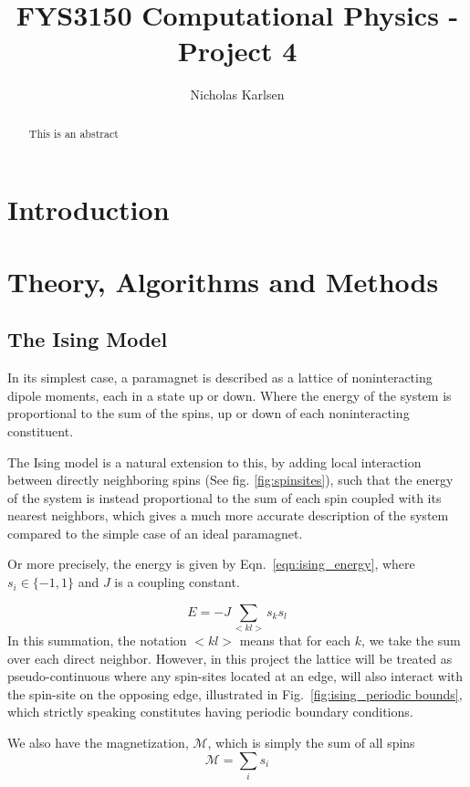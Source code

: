 \documentclass[10pt,showpacs,preprintnumbers,amsmath,amssymb,nofootinbib,aps,prl,twocolumn,groupedaddress,superscriptaddress,showkeys]{revtex4-1}
\begin{document}
\title{FYS3150 Computational Physics - Project 4}
\author{Nicholas Karlsen}


\begin{abstract}
  This is an abstract
\end{abstract}

\maketitle


\section{Introduction}
\section{Theory, Algorithms and Methods}
  \subsection{The Ising Model}
    In its simplest case, a paramagnet is described as a lattice of noninteracting dipole moments, each in a state up or down. Where the energy of the system is proportional to the sum of the spins, up or down of each noninteracting constituent.

    The Ising model is a natural extension to this, by adding local interaction between directly neighboring spins (See fig. \ref{fig:spinsites}), such that the energy of the system is instead proportional to the sum of each spin coupled with its nearest neighbors, which gives a much more accurate description of the system compared to the simple case of an ideal paramagnet.

    Or more precisely, the energy is given by Eqn.~\ref{eqn:ising_energy}, where $s_i \in \{-1, 1\}$ and $J$ is a coupling constant.

    \begin{equation}
      E = -J\sum_{<kl>} s_ks_l
      \label{eqn:ising_energy}
    \end{equation}
    In this summation, the notation $<kl>$ means that for each $k$, we take the sum over each direct neighbor. However, in this project the lattice will be treated as pseudo-continuous where any spin-sites located at an edge, will also interact with the spin-site on the opposing edge, illustrated in Fig.~\ref{fig:ising_periodic bounds}, which strictly speaking constitutes having periodic boundary conditions.

    We also have the magnetization, $\mathcal M$, which is simply the sum of all spins
    \begin{equation*}
      \mathcal M = \sum_i s_i
    \end{equation*}
\end{document}
